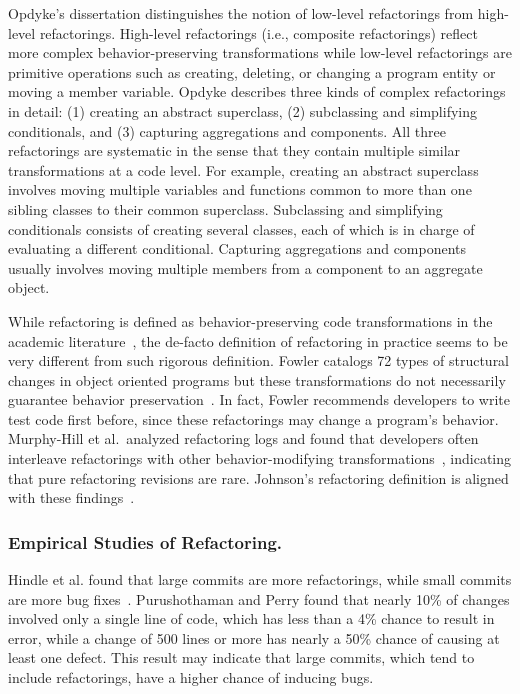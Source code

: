 Opdyke's dissertation \cite{Opdyke1992:ROF} distinguishes the notion of low-level refactorings from high-level refactorings. High-level refactorings (i.e., composite refactorings) reflect more complex behavior-preserving transformations while low-level refactorings are primitive operations such as creating, deleting, or changing a program entity or moving a member variable. Opdyke describes three kinds of complex refactorings in detail: (1) creating an abstract superclass, (2) subclassing and simplifying conditionals, and (3) capturing aggregations and components. All three refactorings are systematic in the sense that they contain multiple similar transformations at a code level. For example, {creating an abstract superclass} involves moving multiple variables and functions common to more than one sibling classes to their common superclass.  {Subclassing and simplifying conditionals} consists of creating  several classes, each of which is in charge of evaluating a different conditional. Capturing aggregations and components usually involves moving {multiple} members from a component to an aggregate object. 

While refactoring is defined as behavior-preserving code transformations in the academic literature~\cite{Mens2004:SSR}, the de-facto definition of refactoring in practice seems to be very different from such rigorous definition. Fowler catalogs 72 types of structural changes in object oriented programs but these transformations do not necessarily guarantee behavior preservation~\cite{1999:RID}. In fact, Fowler recommends developers to write test code first before, since these refactorings may change a program's behavior. Murphy-Hill et al.~analyzed refactoring logs and found that developers often interleave refactorings with other behavior-modifying transformations~\cite{Murphy-Hill2012:refactor}, indicating that pure refactoring revisions are rare. Johnson's refactoring definition is aligned with these findings~\cite{Johnson2011}.

\subsubsection{Empirical Studies of Refactoring.} 
\label{sec:refactoringstudies} 

Hindle et al. found that large commits are more refactorings, while small commits are more bug fixes~\cite{Hindle2008:largecommit}. Purushothaman and Perry found that nearly 10\% of changes involved only a single line of code, which has less than a 4\% chance to result in error, while a change of 500 lines or more has nearly a 50\% chance of causing at least one defect. This result may indicate that large commits, which tend to include refactorings, have a higher chance of inducing bugs. 


